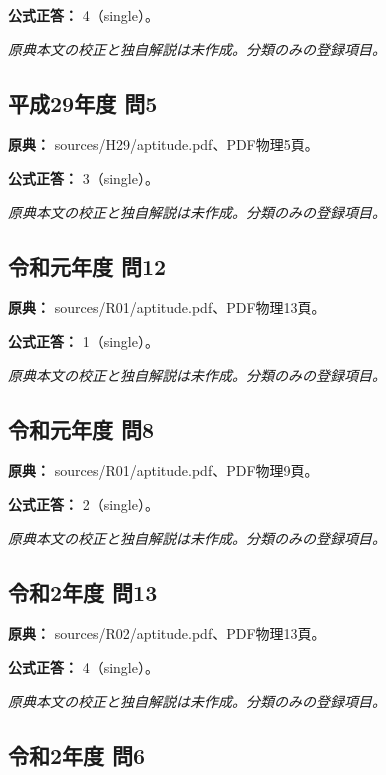 \textbf{公式正答：} 4（single）。

\par\textit{原典本文の校正と独自解説は未作成。分類のみの登録項目。}

\subsection{平成29年度 問5}
\label{q:h29-reg-apt-05}

\noindent\textbf{原典：} sources/H29/aptitude.pdf、PDF物理5頁。

\textbf{公式正答：} 3（single）。

\par\textit{原典本文の校正と独自解説は未作成。分類のみの登録項目。}

\subsection{令和元年度 問12}
\label{q:r01-reg-apt-12}

\noindent\textbf{原典：} sources/R01/aptitude.pdf、PDF物理13頁。

\textbf{公式正答：} 1（single）。

\par\textit{原典本文の校正と独自解説は未作成。分類のみの登録項目。}

\subsection{令和元年度 問8}
\label{q:r01-reg-apt-08}

\noindent\textbf{原典：} sources/R01/aptitude.pdf、PDF物理9頁。

\textbf{公式正答：} 2（single）。

\par\textit{原典本文の校正と独自解説は未作成。分類のみの登録項目。}

\subsection{令和2年度 問13}
\label{q:r02-reg-apt-13}

\noindent\textbf{原典：} sources/R02/aptitude.pdf、PDF物理13頁。

\textbf{公式正答：} 4（single）。

\par\textit{原典本文の校正と独自解説は未作成。分類のみの登録項目。}

\subsection{令和2年度 問6}
\label{q:r02-reg-apt-06}

